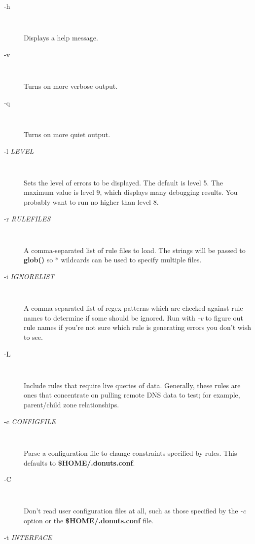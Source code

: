 \begin{description}

\item [-h]\verb" "

Displays a help message.

\item [-v]\verb" "

Turns on more verbose output.

\item [-q]\verb" "

Turns on more quiet output.

\item [-l {\it LEVEL}]\verb" "

Sets the level of errors to be displayed.  The default is level 5.
The maximum value is level 9, which displays many debugging results.
You probably want to run no higher than level 8.

\item [-r {\it RULEFILES}]\verb" "

A comma-separated list of rule files to load.  The strings will be
passed to {\bf glob()} so * wildcards can be used to specify multiple files.

\item [-i {\it IGNORELIST}]\verb" "

A comma-separated list of regex patterns which are checked against rule names
to determine if some should be ignored.  Run with {\it -v} to figure out rule
names if you're not sure which rule is generating errors you don't wish to see.

\item [-L]\verb" "

Include rules that require live queries of data.  Generally, these
rules are ones that concentrate on pulling remote DNS data to test;
for example, parent/child zone relationships.

\item [-c {\it CONFIGFILE}]\verb" "

Parse a configuration file to change constraints specified by rules.
This defaults to {\bf \$HOME/.donuts.conf}.

\item [-C]\verb" "

Don't read user configuration files at all, such as those specified by
the {\it -c} option or the {\bf \$HOME/.donuts.conf} file.

\item [-t {\it INTERFACE}]\verb" "


\end{description}

